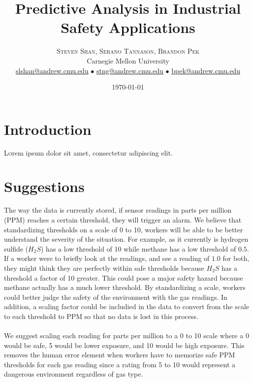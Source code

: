 \documentclass[twoside,twocolumn]{article}
\title{Predictive Analysis in Industrial Safety Applications} %
\author{%
\textsc{Steven Shan, Serano Tannason, Brandon Pek} \\[1ex] %
\normalsize Carnegie Mellon University \\ %
\normalsize \href{mailto:slshan@andrew.cmu.edu}{slshan@andrew.cmu.edu}
$\bullet$
\normalsize \href{mailto:stng@andrew.cmu.edu}{stng@andrew.cmu.edu}
$\bullet$
\normalsize \href{mailto:bpek@andrew.cmu.edu}{bpek@andrew.cmu.edu}
}
\date{\today} %
\begin{document}
\maketitle


\section{Introduction}

\lettrine[nindent=0em,lines=3]{L} orem ipsum dolor sit amet, consectetur adipiscing elit.
\blindtext %

\blindtext %



\section{Suggestions}

The way the data is currently stored, if sensor readings in parts per million (PPM) reaches a certain threshold, they will trigger an alarm. We believe that standardizing thresholds on a scale of 0 to 10, workers will be able to be better understand the severity of the situation. For example, as it currently is hydrogen sulfide ($H_2 S$) has a low threshold of 10 while methane has a low threshold of $0.5$. If a worker were to briefly look at the readings, and see a reading of $1.0$ for both, they might think they are perfectly within safe thresholds because $H_2 S$ has a threshold a factor of 10 greater. This could pose a major safety hazard because methane actually has a much lower threshold. By standardizing a scale, workers could better judge the safety of the environment with the gas readings. In addition, a scaling factor could be includied in the data to convert from the scale to each threshold to PPM so that no data is lost in this process.\\\\
We suggest scaling each reading for parts per million to a 0 to 10 scale where a 0 would be safe, 5 would be lower exposure, and 10 would be high exposure. This removes the human error element when workers have to memorize safe PPM thresholds for each gas reading since a rating from 5 to 10 would represent a dangerous environment regardless of gas type.
\end{document}
